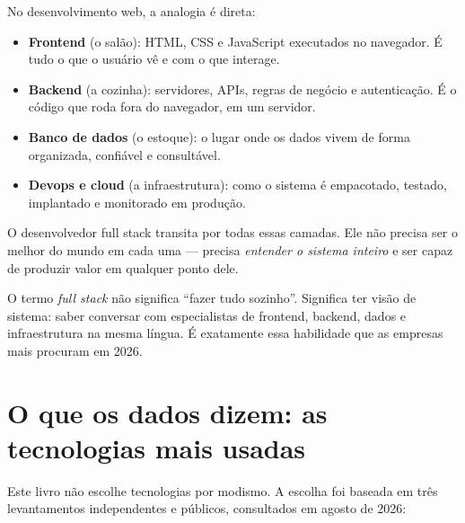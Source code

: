 No desenvolvimento web, a analogia é direta:
\begin{itemize}[leftmargin=*, itemsep=0.3em]
  \item \textbf{Frontend} (o salão): HTML, CSS e JavaScript executados no
  navegador. É tudo o que o usuário vê e com o que interage.
  \item \textbf{Backend} (a cozinha): servidores, APIs, regras de negócio e
  autenticação. É o código que roda fora do navegador, em um servidor.
  \item \textbf{Banco de dados} (o estoque): o lugar onde os dados vivem de
  forma organizada, confiável e consultável.
  \item \textbf{Devops e cloud} (a infraestrutura): como o sistema é
  empacotado, testado, implantado e monitorado em produção.
\end{itemize}

O desenvolvedor full stack transita por todas essas camadas. Ele não precisa
ser o melhor do mundo em cada uma — precisa \emph{entender o sistema inteiro} e
ser capaz de produzir valor em qualquer ponto dele.

\begin{caixadica}
O termo \emph{full stack} não significa ``fazer tudo sozinho''. Significa ter
visão de sistema: saber conversar com especialistas de frontend, backend,
dados e infraestrutura na mesma língua. É exatamente essa habilidade que as
empresas mais procuram em 2026.
\end{caixadica}

\section{O que os dados dizem: as tecnologias mais usadas}

Este livro não escolhe tecnologias por modismo. A escolha foi baseada em três
levantamentos independentes e públicos, consultados em agosto de 2026:

